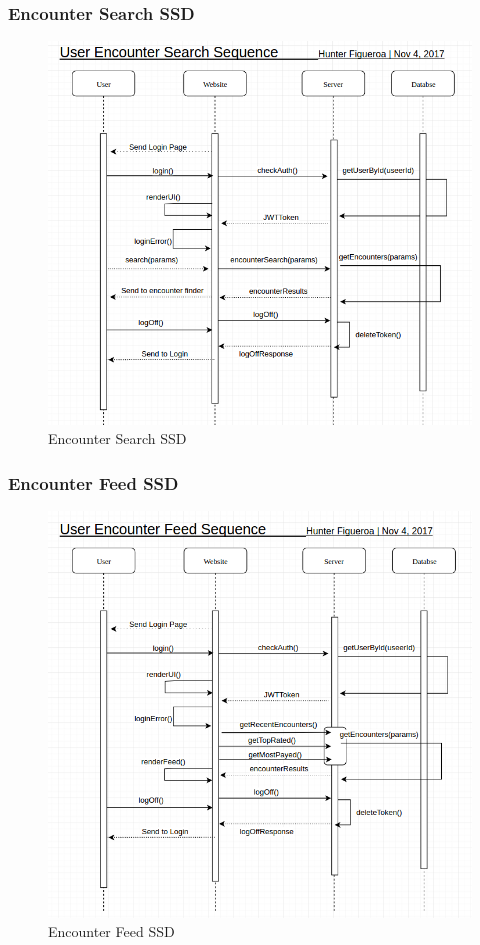 \documentclass[12pt,a4paper]{report}
\begin{document}
	\newpage
	\subsubsection {Encounter Search SSD}
	\begin{figure}[H]
		\centering
		\centerline{\includegraphics[scale=.7, angle=90]{ssd_encounter_search}}
		\caption{Encounter Search SSD}
		\label{fig: Encounter Search SSD }
	\end{figure}
	
	\newpage
	\subsubsection {Encounter Feed SSD}
	\begin{figure}[H]
		\centering
		\centerline{\includegraphics[scale=.7, angle=90]{ssd_encounter_feed}}
		\caption{Encounter Feed SSD}
		\label{fig: Encountner Feed SSD }
	\end{figure}
	
\end{document}
